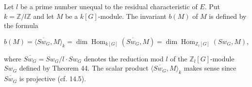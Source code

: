 Let $l$ be a prime number unequal to the residual characteristic of $E$. Put $k = \mathbb{Z}/l\mathbb{Z}$ and let $M$ be a $k[G]$-module. The invariant $b(M)$ of $M$ is defined by the formula

$$b(M) = \langle \overline{Sw_G}, M \rangle_k = \dim \operatorname{Hom}_{k[G]}(\overline{Sw_G}, M) = \dim \operatorname{Hom}_{\mathbb{Z}_l[G]}(Sw_G, M),$$

where $\overline{Sw_G} = Sw_G/l \cdot Sw_G$ denotes the reduction mod $l$ of the $\mathbb{Z}_l[G]$-module $Sw_G$ defined by Theorem 44. The scalar product $\langle \overline{Sw_G}, M \rangle_k$ makes sense since $\overline{Sw_G}$ is projective (cf. 14.5).
